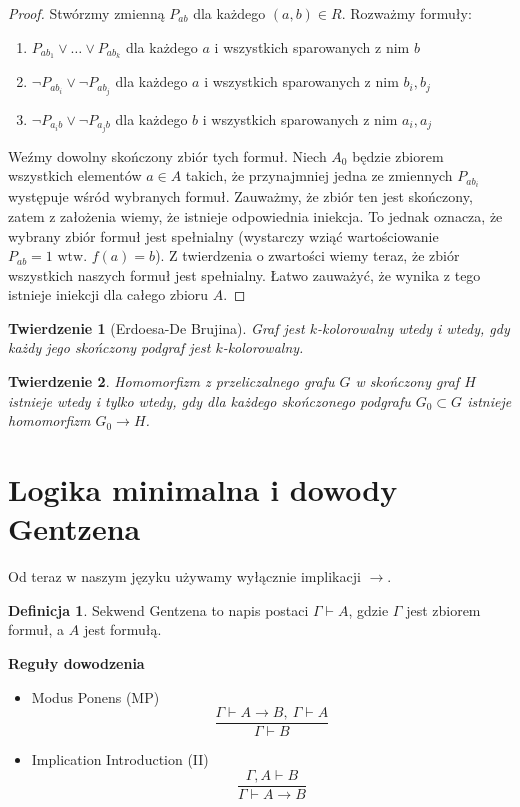 \documentclass[10pt,a4paper]{article}
\theoremstyle{plain}
\newtheorem{theorem}{Twierdzenie}
\theoremstyle{definition}
\newtheorem*{definition}{Definicja}
\newcommand{\impl}{\rightarrow}
\newcommand{\header}[1]{\noindent\textbf{#1}}
\begin{document}
\begin{proof}
Stwórzmy zmienną $P_{ab}$ dla każdego $(a, b) \in R$.
Rozważmy formuły:
\begin{enumerate}
  \item $P_{ab_1} \vee \dots \vee P_{ab_k}$
    dla każdego $a$ i wszystkich sparowanych z nim $b$
  \item $\neg P_{ab_i} \vee \neg P_{ab_j}$
    dla każdego $a$ i wszystkich sparowanych z nim $b_i, b_j$
  \item $\neg P_{a_ib} \vee \neg P_{a_jb}$
    dla każdego $b$ i wszystkich sparowanych z nim $a_i, a_j$
\end{enumerate}
Weźmy dowolny skończony zbiór tych formuł. Niech $A_0$ będzie zbiorem wszystkich
elementów $a \in A$ takich, że przynajmniej jedna ze zmiennych $P_{ab_i}$
występuje wśród wybranych formuł. Zauważmy, że zbiór ten jest skończony, zatem
z założenia wiemy, że istnieje odpowiednia iniekcja. To jednak oznacza, że
wybrany zbiór formuł jest spełnialny (wystarczy wziąć wartościowanie
$P_{ab} = 1 \text{ wtw. } f(a) = b$). Z twierdzenia o zwartości wiemy teraz, że
zbiór wszystkich naszych formuł jest spełnialny. Łatwo zauważyć, że wynika
z tego istnieje iniekcji dla całego zbioru $A$.
\end{proof}

\begin{theorem}[Erdoesa-De Brujina]
Graf jest $k$-kolorowalny wtedy i wtedy, gdy każdy jego skończony podgraf
jest $k$-kolorowalny.
\end{theorem}

\begin{theorem}
Homomorfizm z przeliczalnego grafu $G$ w skończony graf $H$ istnieje
wtedy i tylko wtedy, gdy dla każdego skończonego podgrafu $G_0 \subset G$
istnieje homomorfizm $G_0 \to H$.
\end{theorem}



\section{Logika minimalna i dowody Gentzena}

Od teraz w naszym języku używamy wyłącznie implikacji $\impl$.

\begin{definition}
Sekwend Gentzena to napis postaci $\Gamma \vdash A$, gdzie $\Gamma$ jest zbiorem
formuł, a $A$ jest formułą.
\end{definition}

\header{Reguły dowodzenia}
\begin{itemize}
  \item Modus Ponens (MP)
    $$\frac{\Gamma \vdash A \impl B, \ \Gamma \vdash A}{\Gamma \vdash B}$$
  \item Implication Introduction (II)
    $$\frac{\Gamma,A \vdash B}{\Gamma \vdash A \to B}$$
\end{itemize}
\end{document}

